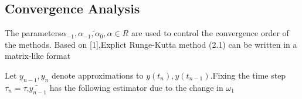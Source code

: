 \documentclass[review]{elsarticle}
\begin{document}
\subsection{Convergence Analysis}
The parameters$ \alpha_{-1},\tilde{\alpha_{-1},\alpha_{0},\alpha} \in R$ are used to control the convergence order of the methods.
Based on [1],Explict Runge-Kutta method (2.1) can be written in a matrix-like format
\begin{figure}[h]
    \centering
\end{figure}


 Let $y_{n-1},y_{n}$ denote approximations to $ y(t_n),y(t_{n-1})$.Fixing the time step $\tau_{n}=\tau$,$\tilde{y_{n-1}}$ has the following estimator due to the change in $\omega_{1}$
\end{document}
